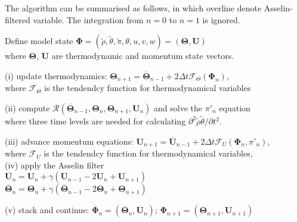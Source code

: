 \documentclass[a4paper,11pt]{article}
\begin{document}
The algorithm can be summarised as follows, in which overline denote Asselin-filtered variable. The integration from $n=0$ to $n=1$ is ignored.

\begin{algorithm}
\begin{tcolorbox}[parbox=false, width=38em]

    Define model state $\mathbf{\Phi} = (\tilde{\rho},\tilde{\theta},\tilde{\pi},\theta,u,v,w) = (\mathbf{\Theta}, \mathbf{U})$\\[-1ex]         
    \qquad where $\mathbf{\Theta}$, $\mathbf{U}$ are thermodynamic and momentum state vectors.\\
    
     {
        (i) update thermodynamics: $\mathbf{\Theta}_{n+1} = \overline{\mathbf{\Theta}}_{n-1} + 2\Delta t \mathcal{F}_{\Theta}(\mathbf{\Phi}_n)$,\\[-1ex]
        \qquad where $\mathcal{F}_{\Theta}$ is the tendendcy function for thermodynamical variables%
        
        (ii) compute $\mathcal{R}(\overline{\mathbf{\Theta}}_{n-1}, \mathbf{\Theta}_{n}, \mathbf{\Theta}_{n+1}, \mathbf{U}_n)$ and solve the $\pi'_{n}$ equation\\[-1ex]
        \qquad where three time levels are needed for calculating $\partial^2\tilde{\rho}\tilde{\theta}/\partial t^2$. 
        
        (iii) advance momentum equations: $\mathbf{U}_{n+1} = \overline{\mathbf{U}}_{n-1} + 2\Delta t \mathcal{F}_{U}(\mathbf{\Phi}_n, \pi'_n)$,\\[-1ex]
        \qquad  where $\mathcal{F}_{U}$ is the tendendcy function for thermodynamical variables,\\[-1ex]
        
        (iv) apply the Asselin filter\\[-1ex] 
\qquad $\overline{\mathbf{U}}_n = \mathbf{U}_n + \gamma (\overline{\mathbf{U}}_{n-1} - 2\mathbf{U}_n + \mathbf{U}_{n+1})$\\[-1ex]    
\qquad $\overline{\mathbf{\Theta}}_n = \mathbf{\Theta}_n + \gamma (\overline{\mathbf{\Theta}}_{n-1} - 2\mathbf{\Theta}_n + \mathbf{\Theta}_{n+1})$        

        (v) stack and continue: $\overline{\mathbf{\Phi}}_n = (\overline{\mathbf{\Theta}}_n, \overline{\mathbf{U}}_n)$; $\mathbf{\Phi}_{n+1} = (\mathbf{\Theta}_{n+1}, \mathbf{U}_{n+1})$
        }        
\end{tcolorbox}    
\end{algorithm}
\end{document}
